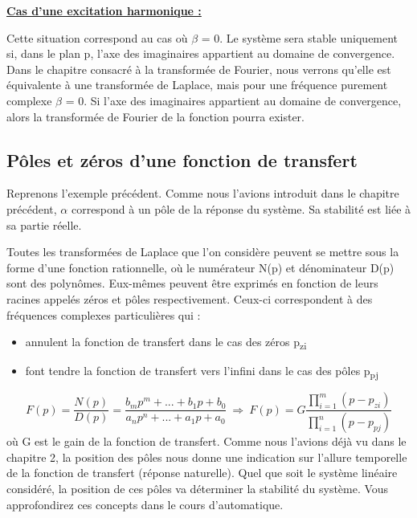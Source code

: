 	\textbf{\underline{Cas d'une excitation harmonique :}}
	
	Cette situation correspond au cas où $\beta $ = 0. Le système sera stable
	uniquement si, dans le plan p, l'axe des imaginaires appartient au
	domaine de convergence. Dans le chapitre consacré à la transformée de
	Fourier, nous verrons qu'elle est équivalente à une transformée de
	Laplace, mais pour une fréquence purement complexe $\beta $ = 0. Si l'axe des
	imaginaires appartient au domaine de convergence, alors la transformée
	de Fourier de la fonction pourra exister.\\
	
	\subsection{Pôles et zéros d'une fonction de transfert}
	
	Reprenons l'exemple précédent. Comme nous l'avions introduit dans le
	chapitre précédent, $\alpha $ correspond à un pôle de la réponse du système. Sa
	stabilité est liée à sa partie réelle.~
	
	Toutes les transformées de Laplace que l'on considère peuvent se mettre sous la forme d'une fonction rationnelle, où le numérateur N(p) et dénominateur D(p) sont
	des polynômes. Eux-mêmes peuvent être exprimés en fonction de leurs
	racines appelés zéros et pôles respectivement. Ceux-ci correspondent à
	des fréquences complexes particulières qui :
	\begin{itemize}
		\item annulent la fonction de transfert dans le cas des zéros p\textsubscript{zi}
	
		\item font tendre la fonction de transfert vers l'infini dans le cas des pôles p\textsubscript{pj}
	\end{itemize}
	
	\begin{equation}\label{key}
	F(p) = \frac{N(p)}{D(p)} = \frac{b_{m}p^{m}+...+b_{1}p+b_{0}}{a_{n}p^{n}+...+a_{1}p+a_{0}} ~\Rightarrow ~ F(p) = G \frac{\prod_{i=1}^{m}(p-p_{zi})}{\prod_{i=1}^{n}(p-p_{pj})}
	\end{equation}
	où G est le gain de la fonction de transfert.
	Comme nous l'avions déjà vu dans le chapitre 2, la position des pôles nous donne une indication sur l'allure temporelle de la fonction de transfert (réponse naturelle).
	Quel que soit le système linéaire considéré, la position de ces pôles va déterminer la stabilité du système. Vous approfondirez ces concepts dans le cours d'automatique.
	
